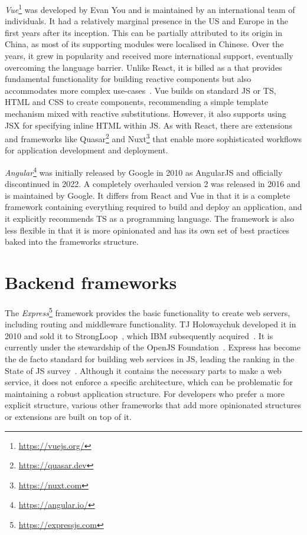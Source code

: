 \emph{Vue}\footnote{\url{https://vuejs.org/}} was developed by Evan You and is maintained by an international team of individuals.
It had a relatively marginal presence in the US and Europe in the first years after its inception.
This can be partially attributed to its origin in China, as most of its supporting modules were localised in Chinese.
Over the years, it grew in popularity and received more international support, eventually overcoming the language barrier.
Unlike React, it is billed as a  that provides fundamental functionality for building reactive components but also accommodates more complex use-cases~\parencite{vueProgressiveFramework}.
Vue builds on standard \ac{JS} or \ac{TS}, \ac{HTML} and \ac{CSS} to create components, recommending a simple template mechanism mixed with reactive substitutions.
However, it also supports using \ac{JSX} for specifying inline \ac{HTML} within \ac{JS}.
As with React, there are extensions and frameworks like Quasar\footnote{\url{https://quasar.dev}} and Nuxt\footnote{\url{https://nuxt.com}} that enable more sophisticated workflows for application development and deployment.

\emph{Angular}\footnote{\url{https://angular.io/}} was initially released by Google in 2010 as AngularJS and officially discontinued in 2022.
A completely overhauled version 2 was released in 2016 and is maintained by Google.
It differs from React and Vue in that it is a complete framework containing everything required to build and deploy an application, and it explicitly recommends \ac{TS} as a programming language.
The framework is also less flexible in that it is more opinionated and has its own set of best practices baked into the framework\textquotesingle s structure.

\section{Backend frameworks}
\label{sec:backend-frameworks}

The \emph{Express}\footnote{\url{https://expressjs.com}} framework provides the basic functionality to create web servers, including routing and middleware functionality.
TJ Holowaychuk developed it in 2010 and sold it to StrongLoop~\parencite{expressJsStrongLoop}, which IBM subsequently acquired~\parencite{expressJsStrongLoopIbm}.
It is currently under the stewardship of the OpenJS Foundation~\parencite{expressJsNodeFoundation}.
Express has become the de facto standard for building web services in JS, leading the ranking in the State of JS survey~\parencite{mostUsedBackendFrameworks22}.
Although it contains the necessary parts to make a web service, it does not enforce a specific architecture, which can be problematic for maintaining a robust application structure.
For developers who prefer a more explicit structure, various other frameworks that add more opinionated structures or extensions are built on top of it.


